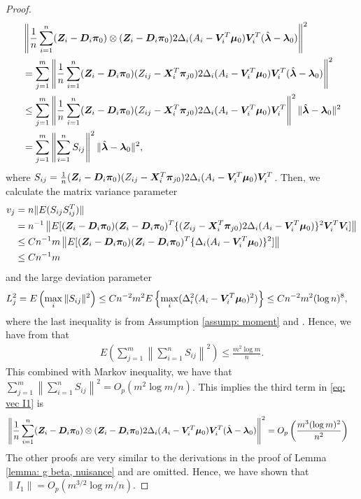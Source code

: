 \documentclass[12pt]{article}
\begin{document}
{\begin{proof}
\begin{align*}
	&\left\| \frac{1}{n} \sum_{i=1}^{n}  (\bm{Z}_i - \bm D_i {\bm\pi}_0) \otimes  (\bm{Z}_i - \bm D_i {\bm\pi}_0) 2\Delta_i (A_i - \bm{V}_i^T \bm\mu_0) \bm{V}_i^T (\hat{\bm \lambda}- \bm\lambda_0) \right\|^2 \\
	&= \sum_{j=1}^{m} \left\| \frac{1}{n} \sum_{i=1}^{n}  (\bm{Z}_i - \bm D_i {\bm\pi}_0)   (Z_{ij} - \bm X_i^T  {\bm\pi}_{j0}) 2\Delta_i (A_i - \bm{V}_i^T \bm\mu_0) \bm{V}_i^T (\hat{\bm \lambda}- \bm\lambda_0) \right\|^2 \\
	&\leq  \sum_{j=1}^{m} \left\| \frac{1}{n} \sum_{i=1}^{n}  (\bm{Z}_i - \bm D_i {\bm\pi}_0)   (Z_{ij} - \bm X_i^T  {\bm\pi}_{j0}) 2\Delta_i (A_i - \bm{V}_i^T \bm\mu_0) \bm{V}_i^T \right\|^2 \| \hat{\bm \lambda}- \bm\lambda_0\|^2 \\
	& =  \sum_{j=1}^{m} \left\| \sum_{i=1}^{n}  S_{ij} \right\|^2 \| \hat{\bm \lambda}- \bm\lambda_0\|^2 ,
\end{align*}
where $ S_{ij} = \frac1n (\bm{Z}_i - \bm D_i {\bm\pi}_0)   (Z_{ij} - \bm X_i^T  {\bm\pi}_{j0}) 2\Delta_i (A_i - \bm{V}_i^T \bm\mu_0) \bm{V}_i^T  $. Then, we calculate the matrix variance parameter 
\begin{align*}
v_j &= n \|E(S_{ij} S_{ij}^T )\| \\
&= n^{-1}  \left\|E[(\bm{Z}_i - \bm D_i {\bm\pi}_0)  (\bm{Z}_i - \bm D_i {\bm\pi}_0)^T  \{ (Z_{ij} - \bm X_i^T  {\bm\pi}_{j0}) 2\Delta_i (A_i - \bm{V}_i^T \bm\mu_0)\}^2  \bm{V}_i^T \bm{V}_i  ] \right\|\\
&\leq C n^{-1} m   \left\|E[(\bm{Z}_i - \bm D_i {\bm\pi}_0)  (\bm{Z}_i - \bm D_i {\bm\pi}_0)^T  \{  \Delta_i (A_i - \bm{V}_i^T \bm\mu_0)\}^2   ] \right\|\\
& \leq Cn^{-1} m  
\end{align*}
and  the large deviation parameter 
\begin{align*}
	L_j^2  &= E\left( \max_i \|S_{ij }\|^2\right) \leq Cn^{-2} m^2 E\left\{ \max_i (\Delta_i^2 (A_i - \bm{V}_i^T \bm\mu_0)^2)\right\} \leq Cn^{-2} m^2 (\log n )^8,
\end{align*}
where the last inequality is from Assumption \ref{assump: moment} and \cite{buhlmann2011statistics}.  Hence, we have from \citet[Theorem 1]{tropp2015expected} that 
\begin{align*}
	E\left( \sum_{j=1}^{m} \left\| \sum_{i=1}^{n}  S_{ij} \right\|^2\right) \leq \frac{m^2\log m}{n}.
\end{align*}
This combined with Markov inequality, we have that $ \sum_{j=1}^{m} \left\| \sum_{i=1}^{n}  S_{ij} \right\|^2= O_p (m^2\log m/n) $. This implies the third term in \eqref{eq: vec I1} is
\begin{align*}
	&\left\| \frac{1}{n} \sum_{i=1}^{n}  (\bm{Z}_i - \bm D_i {\bm\pi}_0) \otimes  (\bm{Z}_i - \bm D_i {\bm\pi}_0) 2\Delta_i (A_i - \bm{V}_i^T \bm\mu_0) \bm{V}_i^T (\hat{\bm \lambda}- \bm\lambda_0) \right\|^2  = O_p\left(\frac{m^3(\log m)^2}{n^2}\right)
\end{align*}
The other proofs are very similar to the derivations in the proof of Lemma \ref{lemma: g beta, nuisance} and are omitted. Hence, we have shown that $ \|I_1\| = O_p(m^{3/2}\log m/n) $. 


\end{proof}}
\end{document}
